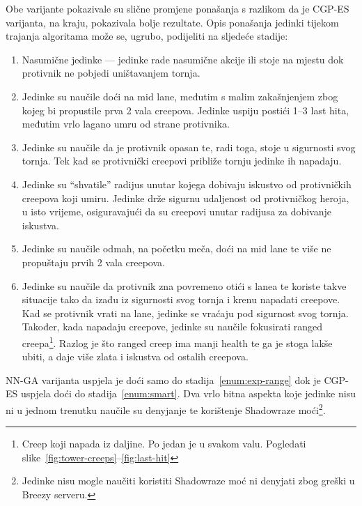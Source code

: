 \documentclass[times, utf8, zavrsni, numeric]{fer}
\begin{document}
Obe varijante pokazivale su slične promjene ponašanja s razlikom da je
CGP-ES varijanta, na kraju, pokazivala bolje rezultate. Opis ponašanja jedinki
tijekom trajanja algoritama može se, ugrubo, podijeliti na sljedeće stadije:
\begin{enumerate}
    \item Nasumične jedinke --- jedinke rade nasumične akcije ili stoje na
        mjestu dok protivnik ne pobjedi uništavanjem tornja.
    \item Jedinke su naučile doći na mid lane, međutim s malim zakašnjenjem zbog
        kojeg bi propustile prva 2 vala creepova. Jedinke uspiju postići 1--3
        last hita, međutim vrlo lagano umru od strane protivnika.
    \item Jedinke su naučile da je protivnik opasan te, radi toga, stoje u
        sigurnosti svog tornja. Tek kad se protivnički creepovi približe tornju
        jedinke ih napadaju.
    \item\label{enum:exp-range} Jedinke su ``shvatile'' radijus unutar kojega
        dobivaju iskustvo od protivničkih creepova koji umiru. Jedinke drže
        sigurnu udaljenost od protivničkog heroja, u isto vrijeme, osiguravajući
        da su creepovi unutar radijusa za dobivanje iskustva.
    \item Jedinke su naučile odmah, na početku meča, doći na mid lane te više ne
        propuštaju prvih 2 vala creepova.
    \item\label{enum:smart} Jedinke su naučile da protivnik zna povremeno otići
        s lanea te koriste takve situacije tako da izađu iz sigurnosti svog
        tornja i krenu napadati creepove. Kad se protivnik vrati na lane,
        jedinke se vraćaju pod sigurnost svog tornja. Također, kada napadaju
        creepove, jedinke su naučile fokusirati ranged creepa\footnote{Creep
        koji napada iz daljine. Po jedan je u svakom valu. Pogledati
        slike~\ref{fig:tower-creeps}--\ref{fig:last-hit}}. Razlog je što ranged
        creep ima manji health te ga je stoga lakše ubiti, a daje više zlata i
        iskustva od ostalih creepova.
\end{enumerate}

NN-GA varijanta uspjela je doći samo do stadija~\ref{enum:exp-range} dok je
CGP-ES uspjela doći do stadija~\ref{enum:smart}. Dva vrlo bitna aspekta koje
jedinke nisu ni u jednom trenutku naučile su denyjanje te korištenje Shadowraze
moći\footnote{Jedinke nisu mogle naučiti koristiti Shadowraze moć ni denyjati
zbog greški u Breezy serveru.}.
\end{document}

